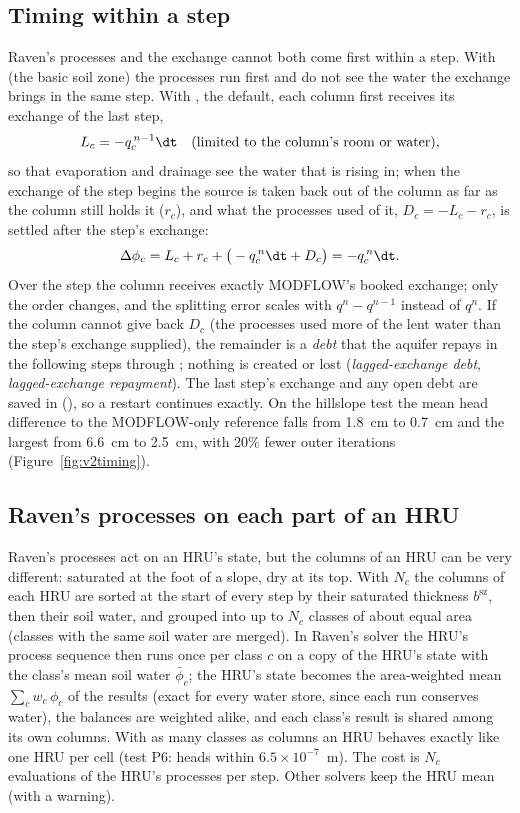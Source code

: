 \subsection{Timing within a step}\label{sec:sztiming}
Raven's processes and the exchange cannot both come first within a step. With  (the basic soil zone)
the processes run first and do not see the water the exchange brings in the same step. With , the
default, each column first receives its exchange of the last step,
\begin{equation}
L_c=-q_c^{\,n-1}\dt\quad\text{(limited to the column's room or water)},
\end{equation}
so that evaporation and drainage see the water that is rising in; when the exchange of the step begins the source is
taken back out of the column as far as the column still holds it ($r_c$), and what the processes used of it,
$D_c=-L_c-r_c$, is settled after the step's exchange:
\begin{equation}
\Delta\phi_c=L_c+r_c+\big(-q_c^{\,n}\dt+D_c\big)=-q_c^{\,n}\dt .
\end{equation}
Over the step the column receives exactly MODFLOW's booked exchange; only the order changes, and the splitting error
scales with $q^n-q^{n-1}$ instead of $q^n$. If the column cannot give back $D_c$ (the processes used more of the lent
water than the step's exchange supplied), the remainder is a \emph{debt} that the aquifer repays in the following
steps through ; nothing is created or lost (\emph{lagged-exchange debt}, \emph{lagged-exchange
repayment}). The last step's exchange and any open debt are saved in  (), so a
restart continues exactly. On the hillslope test the mean head difference to the MODFLOW-only reference falls from
1.8~cm to 0.7~cm and the largest from 6.6~cm to 2.5~cm, with 20\% fewer outer iterations (Figure~\ref{fig:v2timing}).

\subsection{Raven's processes on each part of an HRU}\label{sec:szclasses}
Raven's processes act on an HRU's state, but the columns of an HRU can be very different: saturated at the foot of a
slope, dry at its top. With  $N_c$ the columns of each HRU are sorted at the start of every step by
their saturated thickness $b^{\mathrm{sz}}$, then their soil water, and grouped into up to $N_c$ classes of about equal area
(classes with the same soil water are merged). In Raven's  solver the HRU's process sequence then
runs once per class $c$ on a copy of the HRU's state with the class's mean soil water $\bar\phi_c$; the HRU's state
becomes the area-weighted mean $\sum_cw_c\,\phi_c$ of the results (exact for every water store, since each run
conserves water), the balances are weighted alike, and each class's result is shared among its own columns. With as
many classes as columns an HRU behaves exactly like one HRU per cell (test P6: heads within $6.5\times10^{-7}$~m). The cost is $N_c$
evaluations of the HRU's processes per step. Other solvers keep the HRU mean (with a warning).

